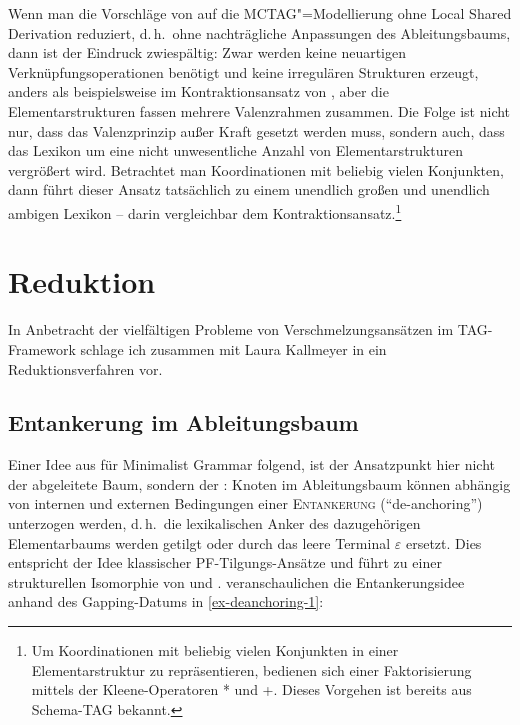 Wenn man die Vorschläge von \cite{Seddah:etal:10} auf die MCTAG"=Modellierung ohne Local Shared Derivation reduziert, d.\,h.\ ohne nachträgliche Anpassungen des Ableitungsbaums, dann ist der Eindruck zwiespältig: Zwar werden keine neuartigen Verknüpfungsoperationen benötigt und keine irregulären Strukturen erzeugt, anders als beispielsweise im Kontraktionsansatz von \cite{Sarkar:Joshi:97}, aber die Elementarstrukturen fassen mehrere Valenzrahmen zusammen. Die Folge  ist nicht nur, dass das Valenzprinzip au\ss er Kraft gesetzt werden muss, sondern auch, dass das Lexikon um eine nicht unwesentliche Anzahl von Elementarstrukturen vergrö\ss ert wird. Betrachtet man Koordinationen mit beliebig vielen Konjunkten, dann führt dieser Ansatz tatsächlich zu einem unendlich gro\ss en und unendlich ambigen Lexikon -- darin vergleichbar dem Kontraktionsansatz.\footnote{Um Koordinationen mit beliebig vielen Konjunkten in einer Elementarstruktur zu repräsentieren, bedienen sich \cite{Seddah:etal:10} einer Faktorisierung mittels der Kleene-Operatoren * und +. Dieses Vorgehen ist bereits aus Schema-TAG \citep{Harbusch:00b} bekannt.}    



\section{Reduktion} \label{sec-deanchoring}

In Anbetracht der vielfältigen Probleme von Verschmelzungsansätzen im TAG-Framework schlage ich zusammen mit Laura Kallmeyer in \cite{Lichte:Kallmeyer:10} ein Reduktionsverfahren vor. 

\subsection{Entankerung im Ableitungsbaum}

Einer Idee aus \cite{Kobele:09} für Minimalist Gram\-mar folgend, ist der Ansatzpunkt hier nicht der abgeleitete Baum, sondern der : Knoten im Ableitungsbaum können abhängig von internen und externen Bedingungen einer \textsc{Entankerung} ("`de-anchoring"') unterzogen werden, d.\,h.\ die lexikalischen Anker des dazugehörigen Elementarbaums werden getilgt oder durch das leere Terminal $\varepsilon$ ersetzt. Dies entspricht der Idee klassischer PF-Tilgungs-Ansätze und führt zu einer strukturellen Isomorphie von  und . \cite{Lichte:Kallmeyer:10} veranschaulichen die Ent\-anker\-ungs\-idee anhand des Gapping-Datums in \ref{ex-deanchoring-1}: 

